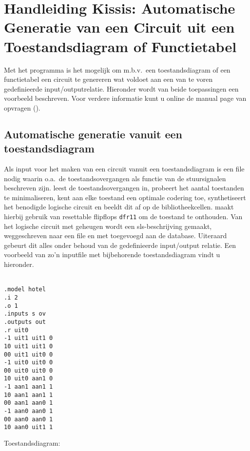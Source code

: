 \section{Handleiding Kissis: Automatische Generatie van een Circuit uit een Toestandsdiagram of Functietabel} 
\label{kissis}
Met het programma  is het mogelijk om m.b.v.\ een toestandsdiagram of een functietabel een circuit te genereren wat voldoet aan een van te voren
gedefinieerde input/outputrelatie. Hieronder wordt van beide toepassingen een
voorbeeld beschreven. Voor verdere informatie kunt u online de manual page van
 opvragen ().

\subsection{Automatische generatie vanuit een toestandsdiagram}
Als input voor het maken van een circuit vanuit een toestandsdiagram is een file nodig waarin o.a.\ de toestandsovergangen als functie van de stuursignalen
beschreven zijn.
 leest de toestandsovergangen in,
probeert het aantal toestanden te minimaliseren,
kent aan elke toestand een optimale codering toe,
synthetiseert het benodigde logische circuit en beeldt dit af op de bibliotheekcellen.
 maakt hierbij gebruik van resettable flipflops {\tt dfr11}
om de toestand te onthouden.
Van het logische circuit met geheugen wordt een sls-beschrijving gemaakt,
weggeschreven naar een file en met  toegevoegd aan de database. 
Uiteraard gebeurt dit alles onder behoud van de gedefinieerde
input/output relatie.
Een voorbeeld van zo'n inputfile met bijbehorende toestandsdiagram 
vindt u hieronder.\\
\\
\begin{minipage}[t]{0.4\textwidth}
\begin{verbatim}
.model hotel
.i 2
.o 1
.inputs s ov
.outputs out
.r uit0
-1 uit1 uit1 0
10 uit1 uit1 0
00 uit1 uit0 0
-1 uit0 uit0 0
00 uit0 uit0 0
10 uit0 aan1 0
-1 aan1 aan1 1
10 aan1 aan1 1
00 aan1 aan0 1
-1 aan0 aan0 1
00 aan0 aan0 1
10 aan0 uit1 1
\end{verbatim}
\end{minipage}
\hfill
\begin{minipage}[t]{0.5\textwidth}
Toestandsdiagram:\\

\end{minipage}
